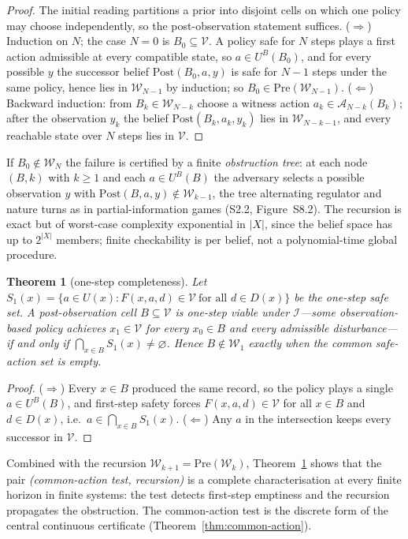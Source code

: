 \documentclass[11pt,a4paper]{article}
\theoremstyle{plain}
\newtheorem{theorem}{Theorem}[section]
\theoremstyle{definition}
\theoremstyle{remark}
\newcommand{\cV}{\mathcal{V}}
\newcommand{\cI}{\mathcal{I}}
\newcommand{\cA}{\mathcal{A}}
\newcommand{\cW}{\mathcal{W}}
\newcommand{\Post}{\mathrm{Post}}
\newcommand{\Pre}{\mathrm{Pre}}
\begin{document}
\begin{proof}
The initial reading partitions a prior into disjoint cells on which one policy may choose independently, so the post-observation statement suffices. ($\Rightarrow$) Induction on $N$; the case $N=0$ is $B_0\subseteq\cV$. A policy safe for $N$ steps plays a first action admissible at every compatible state, so $a\in U^B(B_0)$, and for every possible $y$ the successor belief $\Post(B_0,a,y)$ is safe for $N-1$ steps under the same policy, hence lies in $\cW_{N-1}$ by induction; so $B_0\in\Pre(\cW_{N-1})$. ($\Leftarrow$) Backward induction: from $B_k\in\cW_{N-k}$ choose a witness action $a_k\in\cA_{N-k}(B_k)$; after the observation $y_k$ the belief $\Post(B_k,a_k,y_k)$ lies in $\cW_{N-k-1}$, and every reachable state over $N$ steps lies in $\cV$.
\end{proof}

If $B_0\notin\cW_N$ the failure is certified by a finite \emph{obstruction tree}: at each node $(B,k)$ with $k\ge1$ and each $a\in U^B(B)$ the adversary selects a possible observation $y$ with $\Post(B,a,y)\notin\cW_{k-1}$, the tree alternating regulator and nature turns as in partial-information games (S2.2, Figure~S8.2). The recursion is exact but of worst-case complexity exponential in $|X|$, since the belief space has up to $2^{|X|}$ members; finite checkability is per belief, not a polynomial-time global procedure.

\begin{theorem}[one-step completeness]\label{thm:onestep}
Let $S_1(x)=\{a\in U(x):F(x,a,d)\in\cV\ \text{for all }d\in D(x)\}$ be the one-step safe set. A post-observation cell $B\subseteq\cV$ is one-step viable under $\cI$---some observation-based policy achieves $x_1\in\cV$ for every $x_0\in B$ and every admissible disturbance---if and only if $\bigcap_{x\in B}S_1(x)\ne\varnothing$. Hence $B\notin\cW_1$ exactly when the common safe-action set is empty.
\end{theorem}

\begin{proof}
($\Rightarrow$) Every $x\in B$ produced the same record, so the policy plays a single $a\in U^B(B)$, and first-step safety forces $F(x,a,d)\in\cV$ for all $x\in B$ and $d\in D(x)$, i.e.\ $a\in\bigcap_{x\in B}S_1(x)$. ($\Leftarrow$) Any $a$ in the intersection keeps every successor in $\cV$.
\end{proof}

Combined with the recursion $\cW_{k+1}=\Pre(\cW_k)$, Theorem~\ref{thm:onestep} shows that the pair \emph{(common-action test, recursion)} is a complete characterisation at every finite horizon in finite systems: the test detects first-step emptiness and the recursion propagates the obstruction. The common-action test is the discrete form of the central continuous certificate (Theorem~\ref{thm:common-action}).
\end{document}
